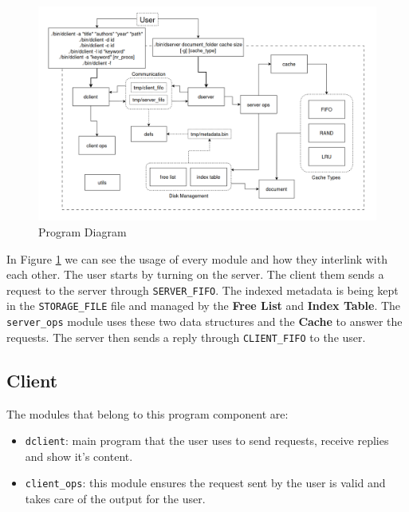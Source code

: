 \documentclass[a4paper, 11pt]{article}
\begin{document}
\begin{figure}[h]
    \centering
    \includegraphics[width=1\linewidth]{report-diagram.png}
    \caption{Program Diagram}
    \label{fig:diagram}
\end{figure}

\noindent In Figure \ref{fig:diagram} we can see the usage of every module and how they interlink with each other. The user starts by turning on the server. The client them sends a request to the server through \texttt{SERVER\_FIFO}. The indexed metadata is being kept in the \texttt{STORAGE\_FILE} file and managed by the \textbf{Free List} and \textbf{Index Table}. The \texttt{server\_ops} module uses these two data structures and the \textbf{Cache} to answer the requests. The server then sends a reply through \texttt{CLIENT\_FIFO} to the user.

\subsection{Client}

The modules that belong to this program component are:

\begin{itemize}
    \item \texttt{dclient}: main program that the user uses to send requests, receive replies and show it's content.
    \item \texttt{client\_ops}: this module ensures the request sent by the user is valid and takes care of the output for the user.
\end{itemize}
\end{document}
